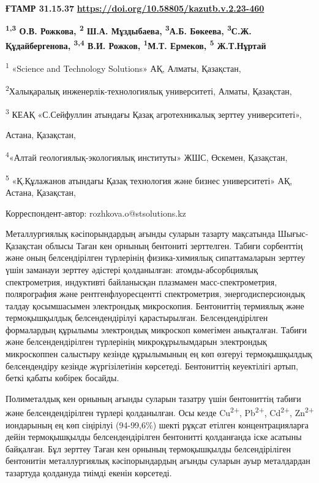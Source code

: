 \newpage
{\bfseries ҒТАМР 31.15.37}
\hfill {\bfseries \href{https://doi.org/10.58805/kazutb.v.2.23-460}{https://doi.org/10.58805/kazutb.v.2.23-460}}


\begin{center}
{\bfseries \textsuperscript{1,3} О.В. Рожкова\envelope, \textsuperscript{2} Ш.А. Мұздыбаева, \textsuperscript{3}А.Б. Бөкеева, \textsuperscript{3}С.Ж. Құдайбергенова, \textsuperscript{3,4} В.И. Рожков, \textsuperscript{1}М.Т. Ермеков, \textsuperscript{5} Ж.Т.Нұртай}

\textsuperscript{1} «Science and Technology Solutions» АҚ, Алматы,
Қазақстан,

\textsuperscript{2}Халықаралық инженерлік-технологиялық университеті,
Алматы, Қазақстан,

\textsuperscript{3} КЕАҚ «С.Сейфуллин атындағы Қазақ агротехникалық
зерттеу университеті»,

Астана, Қазақстан,

\textsuperscript{4}«Алтай геологиялық-экологиялық институты» ЖШС,
Өскемен, Қазақстан,

\textsuperscript{5} «Қ.Құлажанов атындағы Қазақ технология және бизнес
университеті» АҚ, Астана, Қазақстан,

\envelope Корреспондент-автор: rozhkova.o@stsolutions.kz
\end{center}

Металлургиялық кәсіпорындардың ағынды суларын тазарту мақсатында
Шығыс-Қазақстан облысы Таған кен орнының бентониті зерттелген. Табиғи
сорбенттің және оның белсендірілген түрлерінің физика-химиялық
сипаттамаларын зерттеу үшін заманауи зерттеу әдістері қолданылған:
атомды-абсорбциялық спектрометрия, индуктивті байланысқан плазмамен
масс-спектрометрия, полярография және рентгенфлуоресцентті
спектрометрия, энергодисперсиондық талдау қосымшасымен электрондық
микроскопия. Бентониттің термиялық және термоқышқылдық белсендендірілуі
қарастырылған. Белсендендірілген формалардың құрылымы электрондық
микроскоп көмегімен анықталған. Табиғи және белсендендірілген түрлерінің
микроқұрылымдарын электрондық микроскоппен салыстыру кезінде құрылымының
ең көп өзгеруі термоқышқылдық белсендендіру кезінде жүргізілетінін
көрсетеді. Бентониттің кеуектілігі артып, беткі қабаты көбірек босайды.

Полиметалдық кен орнының ағынды суларын тазатру үшін бентониттің табиғи
және белсендендірілген түрлері қолданылған. Осы кезде
Cu\textsuperscript{2+}, Pb\textsuperscript{2+}, Cd\textsuperscript{2+},
Zn\textsuperscript{2+} иондарының ең көп сіңірілуі (94-99,6\%) шекті
рұқсат етілген концентрацияларға дейін термоқышқылды белсендендірілген
бентонитті қолданғанда іске асатыны байқалған. Бұл зерттеу Таған кен
орнының термоқышқылды белсендіріліген бентонитін металлургиялық
кәсіпорындардың ағынды суларын ауыр металдардан тазартуда қолдануда
тиімді екенін көрсетеді.

